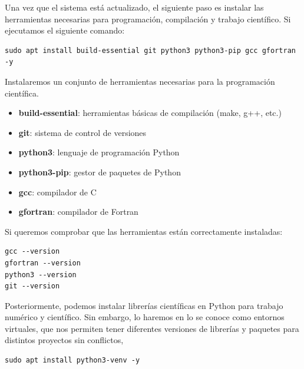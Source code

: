 \documentclass[12pt]{article}
\begin{document}
Una vez que el sistema está actualizado, el siguiente paso es instalar las herramientas 
necesarias para programación, compilación y trabajo científico.
Si ejecutamos el siguiente comando:
\begin{lstlisting}
sudo apt install build-essential git python3 python3-pip gcc gfortran -y
\end{lstlisting}
Instalaremos un conjunto de herramientas necesarias para la programación científica.
\begin{itemize}
    \item \textbf{build-essential}: herramientas básicas de compilación (make, g++, etc.)
    \item \textbf{git}: sistema de control de versiones
    \item \textbf{python3}: lenguaje de programación Python
    \item \textbf{python3-pip}: gestor de paquetes de Python
    \item \textbf{gcc}: compilador de C
    \item \textbf{gfortran}: compilador de Fortran
\end{itemize}
Si queremos comprobar que las herramientas están correctamente instaladas:
\begin{lstlisting}
gcc --version
gfortran --version
python3 --version
git --version
\end{lstlisting}
Posteriormente, podemos instalar librerías científicas en Python para trabajo numérico y científico. Sin embargo,
lo haremos en lo se conoce como entornos virtuales, que nos permiten tener diferentes versiones de 
librerías y paquetes para distintos proyectos sin conflictos, 
\begin{lstlisting}
sudo apt install python3-venv -y
\end{lstlisting}
\end{document}
